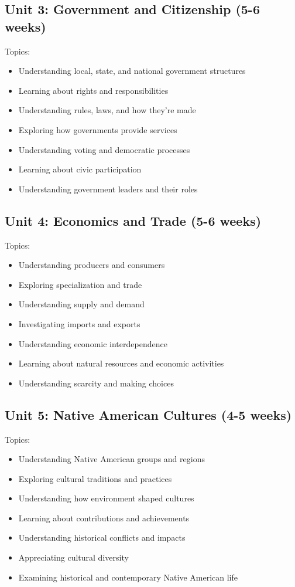 \documentclass[11pt,letterpaper]{report}
\begin{document}
\subsection{Unit 3: Government and Citizenship (5-6 weeks)}

Topics:
\begin{itemize}
\item Understanding local, state, and national government structures
\item Learning about rights and responsibilities
\item Understanding rules, laws, and how they're made
\item Exploring how governments provide services
\item Understanding voting and democratic processes
\item Learning about civic participation
\item Understanding government leaders and their roles
\end{itemize}

\subsection{Unit 4: Economics and Trade (5-6 weeks)}

Topics:
\begin{itemize}
\item Understanding producers and consumers
\item Exploring specialization and trade
\item Understanding supply and demand
\item Investigating imports and exports
\item Understanding economic interdependence
\item Learning about natural resources and economic activities
\item Understanding scarcity and making choices
\end{itemize}

\subsection{Unit 5: Native American Cultures (4-5 weeks)}

Topics:
\begin{itemize}
\item Understanding Native American groups and regions
\item Exploring cultural traditions and practices
\item Understanding how environment shaped cultures
\item Learning about contributions and achievements
\item Understanding historical conflicts and impacts
\item Appreciating cultural diversity
\item Examining historical and contemporary Native American life
\end{itemize}
\end{document}
